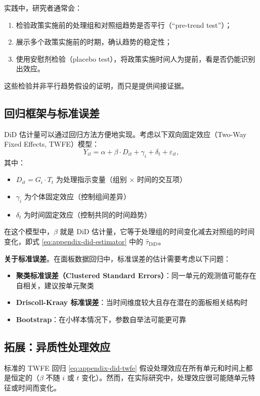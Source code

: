 实践中，研究者通常会：
\begin{enumerate}
  \item 检验政策实施前的处理组和对照组趋势是否平行（``pre-trend test''）；
  \item 展示多个政策实施前的时期，确认趋势的稳定性；
  \item 使用安慰剂检验（placebo test），将政策实施时间人为提前，看是否仍能识别出效应。
\end{enumerate}

这些检验并非平行趋势假设的证明，而只是提供间接证据。

\subsection{回归框架与标准误差}\label{sec:appendix-did-reg}

DiD 估计量可以通过回归方法方便地实现。考虑以下双向固定效应（Two-Way Fixed Effects, TWFE）模型：
\[
Y_{it} = \alpha + \beta \cdot D_{it} + \gamma_i + \delta_t + \varepsilon_{it},
\label{eq:appendix-did-twfe}
\]
其中：
\begin{itemize}
  \item $D_{it} = G_i \cdot T_t$ 为处理指示变量（组别 $\times$ 时间的交互项）
  \item $\gamma_i$ 为个体固定效应（控制组间差异）
  \item $\delta_t$ 为时间固定效应（控制共同的时间趋势）
\end{itemize}

在这个模型中，$\beta$ 就是 DiD 估计量，它等于处理组的时间变化减去对照组的时间变化，即式 \cref{eq:appendix-did-estimator} 中的 $\hat{\tau}_\text{DiD}$。

\textbf{关于标准误差}。在面板数据回归中，标准误差的估计需要考虑以下问题：
\begin{itemize}
  \item \textbf{聚类标准误差（Clustered Standard Errors）}：同一单元的观测值可能存在自相关，建议按单元聚类
  \item \textbf{Driscoll-Kraay 标准误差}：当时间维度较大且存在潜在的面板相关结构时
  \item \textbf{Bootstrap}：在小样本情况下，参数自举法可能更可靠
\end{itemize}

\subsection{拓展：异质性处理效应}\label{sec:appendix-did-hetero}

标准的 TWFE 回归 \cref{eq:appendix-did-twfe} 假设处理效应在所有单元和时间上都是恒定的（$\beta$ 不随 $i$ 或 $t$ 变化）。然而，在实际研究中，处理效应很可能随单元特征或时间而变化。

